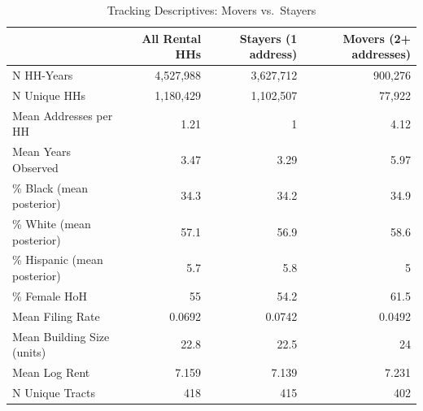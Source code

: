 \begin{table}[htbp]
\centering
\caption{Tracking Descriptives: Movers vs.\ Stayers}
\label{tab:tracking_descriptives}
\begin{tabular}{lrrr}
\toprule
 & All Rental HHs & Stayers (1 address) & Movers (2+ addresses) \\
\midrule
N HH-Years & 4,527,988 & 3,627,712 &   900,276 \\
N Unique HHs & 1,180,429 & 1,102,507 &    77,922 \\
Mean Addresses per HH & 1.21 & 1 & 4.12 \\
Mean Years Observed & 3.47 & 3.29 & 5.97 \\
\% Black (mean posterior) & 34.3 & 34.2 & 34.9 \\
\% White (mean posterior) & 57.1 & 56.9 & 58.6 \\
\% Hispanic (mean posterior) & 5.7 & 5.8 & 5 \\
\% Female HoH & 55 & 54.2 & 61.5 \\
Mean Filing Rate & 0.0692 & 0.0742 & 0.0492 \\
Mean Building Size (units) & 22.8 & 22.5 & 24 \\
Mean Log Rent & 7.159 & 7.139 & 7.231 \\
N Unique Tracts & 418 & 415 & 402 \\
\bottomrule
\end{tabular}
\end{table}
